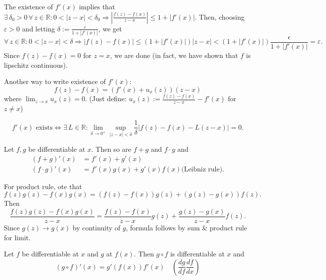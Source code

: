 \documentclass{notes}
\begin{document}
  \begin{prf}
    The existence of $f'(x)$ implies that $\exists \, \delta_0 > 0 \, \forall \, z \in \mathbb R: 0 < \left | z - x \right | < \delta_0 \Rightarrow \left | \frac{f(z) - f(x)}{z - x} \right | \leq 1 + \left | f'(x) \right |$.
    Then, choosing $\varepsilon > 0$ and letting $\delta := \frac{\varepsilon}{1 + \left | f'(x) \right |}$, we get 
    \[
      \forall \, z \in \mathbb R: 0 < \left | z - x \right | < \delta \mathbb \Rightarrow \left | f(z) - f(x) \right | \leq (1 + \left | f'(x) \right |) \left | z - x \right | < (1 + \left | f'(x) \right |) \frac{\epsilon}{1 + \left | f'(x) \right |} = \varepsilon.
    \]
    Since $f(z) - f(x) = 0$ for $z = x$, we are done (in fact, we have shown that $f$ is lipschitz continuous).
  \end{prf}
  
  Another way to write existence of $f'(x)$: 
  \[
    f(z) - f(x) = (f'(x) + u_x(z)) (z - x)
  \]
  where $\lim_{z \to x} u_x(z) = 0$.
  (Just define: $u_x(z) := \frac{f(z) - f(x)}{z - x} - f'(x)$ for $z \neq x$)
  
  \begin{lem}
    \[
      \text{$f'(x)$ exists} \Leftrightarrow \exists \, L \in \mathbb R: \lim_{\delta \to 0^+} \sup_{\left | z - x \right | < \delta} \frac{1}{\delta} \left | f(z) - f(x) - L (z - x) \right | = 0.
    \]
  \end{lem}
  
  \begin{lem}
    Let $f, g$ be differentiable at $x$.
    Then so are $f + g$ and $f \cdot g$ and 
    \begin{align*}
      (f + g)'(x) &= f'(x) + g'(x) \\ 
      (f \cdot g)'(x) &= f'(x) g(x) + g'(x) f(x) \text{(Leibniz rule)}.
    \end{align*}
  \end{lem}
  
  \begin{prf} For product rule, ote that  
    \[
      f(z) g(z) - f(x) g(x) = (f(z) - f(x)) g(z) + (g(z) - g(x)) f(z).
    \]
    Then 
    \[
      \frac{f(z) g(z) - f(x) g(x)}{z - x} = \frac{f(z) - f(x)}{z - x} g(z) + \frac{g(z) - g(x)}{z - x} f(z).
    \]
    Since $g(z) \to g(x)$ by continuity of $g$, formula follows by sum \& product rule for limit.
  \end{prf}
  
  \begin{lem}
    Let $f$ be differentiable at $x$ and $g$ at $f(x)$.
    Then $g \circ f$ is differentiable at $x$ and 
    \[
      (g \circ f)'(x) = g'(f(x)) f'(x) \quad \left ( \frac{dg}{df} \frac{df}{dx} \right )
    \]
  \end{lem}
  
\end{document}
